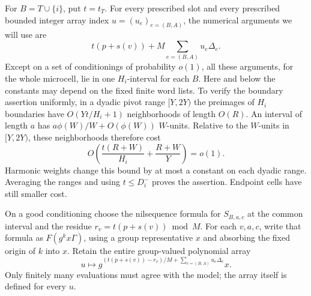 For $B=T\cup\{i\}$, put $t=t_T$.  For every prescribed slot and
every prescribed bounded integer array index $u=(u_e)_{e=(B,A)}$,
the numerical arguments we will use are
\begin{equation}\label{eq:alignment-array-argument}
 t(p+s(v))+M\sum_{e=(B,A)}u_e\Delta_e.
\end{equation}
Except on a set of conditionings of probability $o(1)$, all these
arguments, for the whole microcell, lie in one $H_i$-interval for
each $B$.  Here and below the constants may depend on the fixed
finite word lists.  To verify the boundary assertion uniformly, in
a dyadic pivot range $[Y,2Y)$ the preimages of $H_i$ boundaries have
$O(Yt/H_i+1)$ neighborhoods of length $O(R)$.  An interval of length
$a$ has $a\phi(W)/W+O(\phi(W))$ $W$-units.  Relative to the
$W$-units in $[Y,2Y)$, these neighborhoods therefore cost
\[
 O\left(\frac{t(R+W)}{H_i}+\frac{R+W}{Y}\right)=o(1).
\]
Harmonic weights change this bound by at most a constant on each
dyadic range.  Averaging the ranges and using $t\le D_i^-$ proves
the assertion.  Endpoint cells have still smaller cost.

On a good conditioning choose the nilsequence formula for
$S_{B,a,c}$ at the common interval and the residue
$r_v=t(p+s(v))\bmod M$.  For each $v,a,c$, write that formula as
$F(g^k x\Gamma)$, using a group representative $x$ and absorbing
the fixed origin of $k$ into $x$.  Retain the entire group-valued
polynomial array
\begin{equation}\label{eq:alignment-polynomial-array}
 u\longmapsto
 g^{(t(p+s(v))-r_v)/M+\sum_{e=(B,A)}u_e\Delta_e}x.
\end{equation}
Only finitely many evaluations must agree with the model; the array
itself is defined for every $u$.

